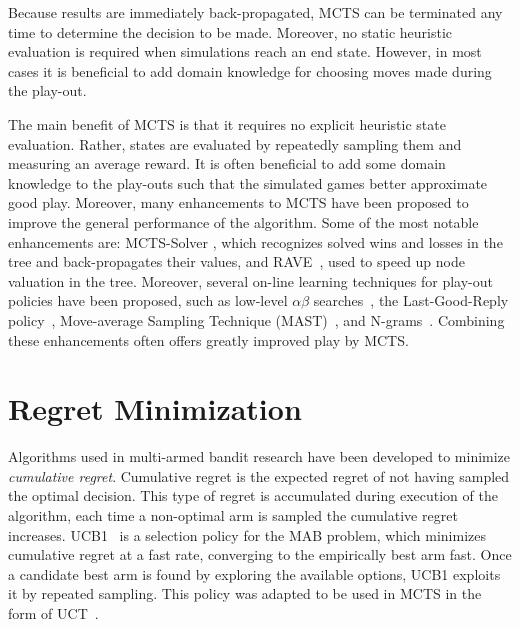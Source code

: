 \documentclass{kecsmstr}
\begin{document}
Because results are immediately back-propagated, MCTS can be terminated any time to determine the decision to be made. Moreover, no static heuristic evaluation is required when simulations reach an end state. However, in most cases it is beneficial to add domain knowledge for choosing moves made during the play-out.

The main benefit of MCTS is that it requires no explicit heuristic state evaluation. Rather, states are evaluated by repeatedly sampling them and measuring an average reward. It is often beneficial to add some domain knowledge to the play-outs such that the simulated games better approximate good play. Moreover, many enhancements to MCTS have been proposed to improve the general performance of the algorithm. Some of the most notable enhancements are: MCTS-Solver , which recognizes solved wins and losses in the tree and back-propagates their values, and RAVE~, used to speed up node valuation in the tree. Moreover, several on-line learning techniques for play-out policies have been proposed, such as low-level $\alpha\beta$ searches~, the Last-Good-Reply policy~, Move-average Sampling Technique (MAST)~, and N-grams~. Combining these enhancements often offers greatly improved play by MCTS.

\section{Regret Minimization}
Algorithms used in multi-armed bandit research have been developed to minimize \emph{cumulative regret}. Cumulative regret is the expected regret of not having sampled the optimal decision. This type of regret is accumulated during execution of the algorithm, each time a non-optimal arm is sampled the cumulative regret increases. UCB1~ is a selection policy for the MAB problem, which minimizes cumulative regret at a fast rate, converging to the empirically best arm fast. Once a candidate best arm is found by exploring the available options, UCB1 exploits it by repeated sampling. This policy was adapted to be used in MCTS in the form of UCT~.
\end{document}
